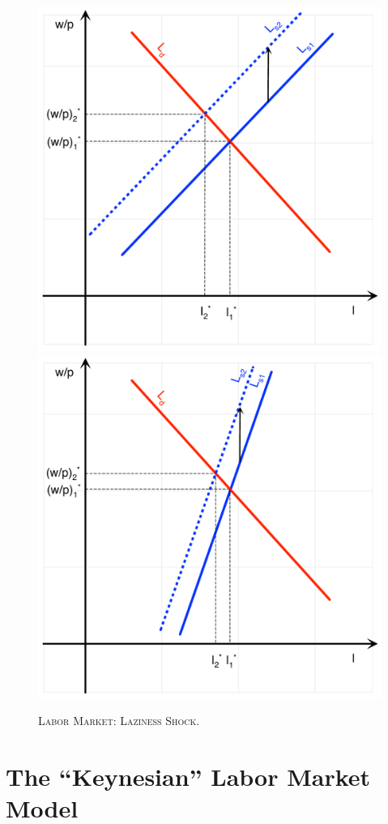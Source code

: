 \documentclass[]{book}
\theoremstyle{definition}
\theoremstyle{definition}
\theoremstyle{definition}
\theoremstyle{remark}
\begin{document}
\begin{figure}

{\centering \includegraphics[width=0.49\linewidth,height=1\textheight]{graphsketcher/labor-market-laziness-shock-low-epsilon} \includegraphics[width=0.49\linewidth,height=1\textheight]{graphsketcher/labor-market-laziness-shock-high-epsilon} 

}

\caption{\textsc{Labor Market: Laziness Shock}.}\label{fig:labor-market-laziness-shock}
\end{figure}

\section{\texorpdfstring{The ``Keynesian'' Labor Market
Model}{The Keynesian Labor Market Model}}\label{the-keynesian-labor-market-model-1}
\end{document}
